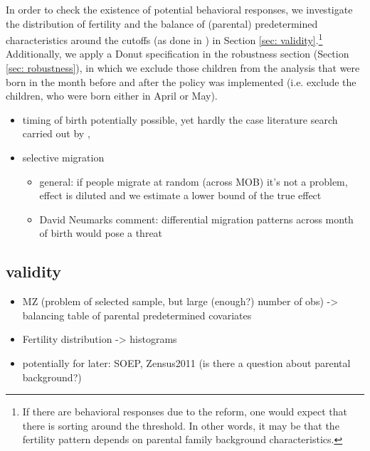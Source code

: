 \documentclass[11pt, a4paper,draft]{article} %
\begin{document}
In order to check the existence of potential behavioral responses, we investigate the distribution of fertility and the balance of (parental) predetermined characteristics around the cutoffs (as done in \cite{dinardo2004economic}) in Section \ref{sec: validity}.\footnote{If there are behavioral responses due to the reform, one would expect that there is sorting around the threshold. In other words, it may be that the fertility pattern depends on parental family background characteristics.} Additionally, we apply a Donut specification in the robustness section (Section \ref{sec: robustness}), in which we exclude those children from the analysis that were born in the month before and after the policy was implemented (i.e. exclude the children, who were born either in April or May).



\begin{itemize}
	\item timing of birth potentially possible, yet hardly the case literature search carried out by \cite{Dustmann2012},
	\item selective migration 
  \begin{itemize}
    \item general: if people migrate at random (across MOB) it's not a problem, effect is diluted and we estimate a lower bound of the true effect
    \item David Neumarks comment: differential migration patterns across month of birth would pose a threat
  \end{itemize}
\end{itemize}




\subsection{validity}\label{sec:empirical_strategy_3validity}
\begin{itemize}
	\item MZ (problem of selected sample, but large (enough?) number of obs) -> balancing table of parental predetermined covariates
	\item Fertility distribution  -> histograms
	\item potentially for later: SOEP, Zensus2011 (is there a question about parental background?)
\end{itemize}

\end{document}
